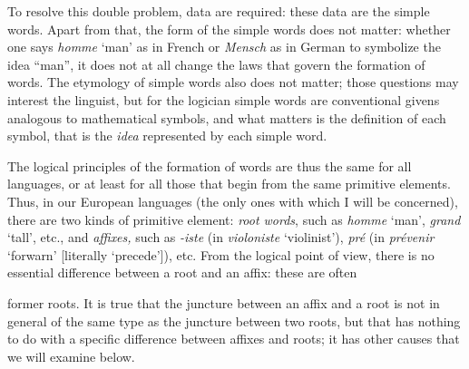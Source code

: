 \begin{sloppypar}
{  To resolve this double problem, data are required: these data are
  the simple words. Apart from that, the form of the simple words does
  not matter: whether one says \emph{homme} `man' as in French or
  \emph{Mensch} as in German to symbolize the idea ``man'', it does
  not at all change the laws that govern the formation of words. The
  etymology of simple words also does not matter; those questions may
  interest the linguist, but for the logician simple words are
  conventional givens analogous to mathematical symbols, and what
  matters is the definition of each symbol, that is the \emph{idea}
  represented by each simple word.

  The logical principles of the formation of words are thus the same
  for all languages, or at least for all those that begin from the
  same primitive elements. Thus, in our European languages (the only
  ones with which I will be concerned), there are two kinds of
  primitive element: \emph{root words}, such as \emph{homme} `man',
  \emph{grand} `tall', etc., and \emph{affixes,} such as \emph{-iste}
  (in \emph{violoniste} `violinist'), \emph{pré} (in \emph{prévenir}
  `forwarn' [literally `precede']), etc. From the logical point of
  view, there is no essential difference between a root and an affix:
  these are often}


{\protect\noindent former roots. It is true that the juncture between
  an affix and a root is not in general of the same type as the
  juncture between two roots, but that has nothing to do with a
  specific difference between affixes and roots; it has other causes
  that we will examine below.

}
\end{sloppypar}
